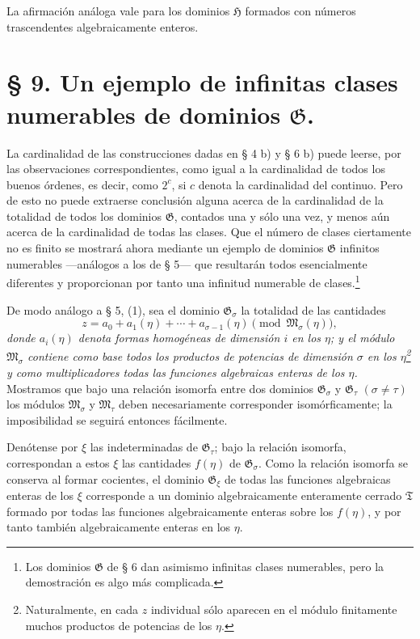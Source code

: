 La afirmación análoga vale para los dominios $\mathfrak H$ formados con números trascendentes algebraicamente enteros.

\section*{§ 9. Un ejemplo de infinitas clases numerables de dominios $\mathfrak G$.}

La cardinalidad de las construcciones dadas en § 4 b) y § 6 b) puede leerse, por las observaciones correspondientes, como igual a la cardinalidad de todos los buenos órdenes, es decir, como $2^c$, si $c$ denota la cardinalidad del continuo. Pero de esto no puede extraerse conclusión alguna acerca de la cardinalidad de la totalidad de todos los dominios $\mathfrak G$, contados una y sólo una vez, y menos aún acerca de la cardinalidad de todas las clases. Que el número de clases ciertamente no es finito se mostrará ahora mediante un ejemplo de dominios $\mathfrak G$ infinitos numerables ---análogos a los de § 5--- que resultarán todos esencialmente diferentes y proporcionan por tanto una infinitud numerable de clases.\footnote{Los dominios $\mathfrak G$ de § 6 dan asimismo infinitas clases numerables, pero la demostración es algo más complicada.}

De modo análogo a § 5, (1), sea el dominio $\mathfrak G_\sigma$ la totalidad de las cantidades
\begin{equation}
 z=a_0+a_1(\eta)+\cdots+a_{\sigma-1}(\eta)
 \pmod{\mathfrak M_\sigma(\eta)},
\tag{1}
\end{equation}
\emph{donde $a_i(\eta)$ denota formas homogéneas de dimensión $i$ en los $\eta$; y el módulo $\mathfrak M_\sigma$ contiene como base todos los productos de potencias de dimensión $\sigma$ en los $\eta$\footnote{Naturalmente, en cada $z$ individual sólo aparecen en el módulo finitamente muchos productos de potencias de los $\eta$.} y como multiplicadores todas las funciones algebraicas enteras de los $\eta$.} Mostramos que bajo una relación isomorfa entre dos dominios $\mathfrak G_\sigma$ y $\mathfrak G_\tau$ $(\sigma\ne\tau)$ los módulos $\mathfrak M_\sigma$ y $\mathfrak M_\tau$ deben necesariamente corresponder isomórficamente; la imposibilidad se seguirá entonces fácilmente.

Denótense por $\xi$ las indeterminadas de $\mathfrak G_\tau$; bajo la relación isomorfa, correspondan a estos $\xi$ las cantidades $f(\eta)$ de $\mathfrak G_\sigma$. Como la relación isomorfa se conserva al formar cocientes, el dominio $\mathfrak G_\xi$ de todas las funciones algebraicas enteras de los $\xi$ corresponde a un dominio algebraicamente enteramente cerrado $\mathfrak T$ formado por todas las funciones algebraicamente enteras sobre los $f(\eta)$, y por tanto también algebraicamente enteras en los $\eta$.

